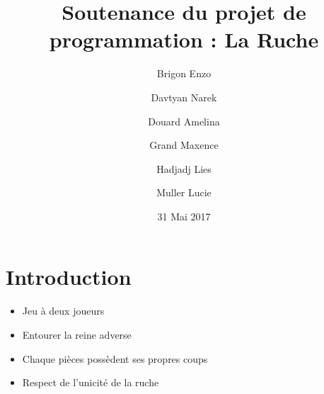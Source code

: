 \documentclass{beamer}
\title{Soutenance du projet de programmation : La Ruche}
\date{31 Mai 2017}
\author[1]{Brigon Enzo \and Davtyan Narek \and Douard Amelina \and Grand Maxence \and Hadjadj Lies \and Muller Lucie }
\begin{document}
\begin{frame}
  \titlepage
\end{frame}

\begin{frame}
  \tableofcontents[]
\end{frame}

\section{Introduction}%

\begin{frame}
\begin{itemize}
\frametitle{Rappel des r\`egles}
\item Jeu \`a deux joueurs
\item Entourer la reine adverse
\item Chaque pi\`eces poss\`edent ses propres coups
\item Respect de l'unicit\'e de la ruche
\end{itemize}
\end{frame}
\end{document}
